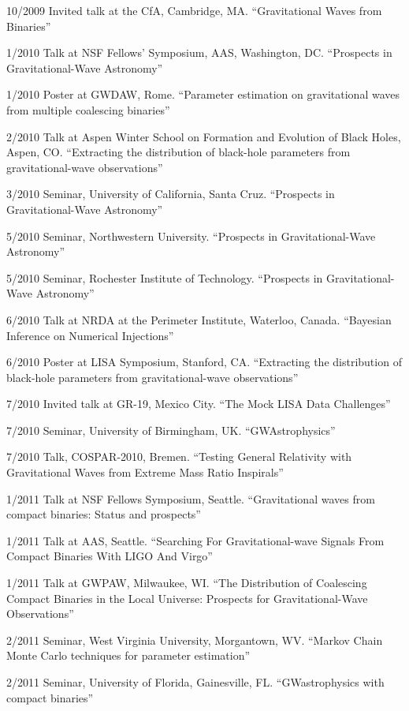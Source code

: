 \documentclass[margin,line]{res}
\begin{document}
\begin{resume}
10/2009	Invited talk at the CfA, Cambridge, MA.  ``Gravitational Waves from Binaries''

1/2010	Talk at NSF Fellows' Symposium, AAS, Washington, DC. ``Prospects in Gravitational-Wave Astronomy''

1/2010	Poster at GWDAW, Rome.  ``Parameter estimation on gravitational waves from multiple coalescing binaries''

2/2010	Talk at Aspen Winter School on Formation and Evolution of Black Holes, Aspen, CO.  ``Extracting the distribution of black-hole parameters from gravitational-wave observations''

3/2010	Seminar, University of California, Santa Cruz. ``Prospects in Gravitational-Wave Astronomy''

5/2010	Seminar, Northwestern University. ``Prospects in Gravitational-Wave Astronomy''

5/2010	Seminar, Rochester Institute of Technology. ``Prospects in Gravitational-Wave Astronomy''

6/2010	Talk at NRDA at the Perimeter Institute, Waterloo, Canada. ``Bayesian Inference on Numerical Injections''

6/2010	Poster at LISA Symposium, Stanford, CA.  ``Extracting the distribution of black-hole parameters from gravitational-wave observations''

7/2010	Invited talk at GR-19, Mexico City.  ``The Mock LISA Data Challenges''

7/2010	Seminar, University of Birmingham, UK.  ``GWAstrophysics''

7/2010	Talk, COSPAR-2010, Bremen.  ``Testing General Relativity with Gravitational Waves from Extreme Mass Ratio Inspirals''

1/2011 	Talk at NSF Fellows Symposium, Seattle. 	``Gravitational waves from compact binaries: Status and prospects''

1/2011 	Talk at AAS, Seattle. 	``Searching For Gravitational-wave Signals From Compact Binaries With LIGO And Virgo''

1/2011 	Talk at GWPAW, Milwaukee, WI.	 ``The Distribution of Coalescing Compact Binaries in the Local Universe: Prospects for Gravitational-Wave Observations''

2/2011 	Seminar, West Virginia University, Morgantown, WV. 	``Markov Chain Monte Carlo techniques for parameter estimation''

2/2011 	Seminar, University of Florida, Gainesville, FL. 	``GWastrophysics with compact binaries''


\end{resume}
\end{document}
